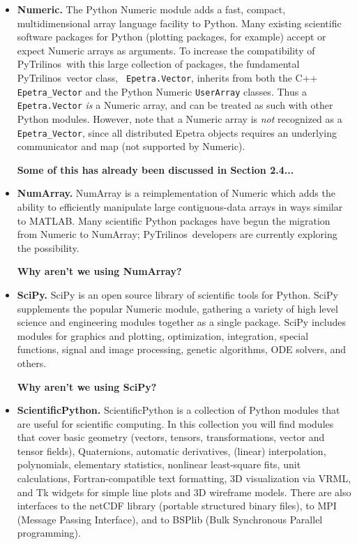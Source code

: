 \documentclass[acmtocl]{acmtrans2m}
\newcommand{\PyTrilinos}{{PyTrilinos}}
\begin{document}
\begin{itemize}

\item {\bf Numeric.} The Python Numeric module adds a fast, compact,
  multidimensional array language facility to Python.  Many existing
  scientific software packages for Python (plotting packages, for
  example) accept or expect Numeric arrays as arguments.  To increase
  the compatibility of \PyTrilinos\ with this large collection of
  packages, the fundamental \PyTrilinos\ vector class, {\tt
    Epetra.Vector}, inherits from both the C++ {\tt Epetra\_Vector}
  and the Python Numeric {\tt UserArray} classes.  Thus a {\tt
    Epetra.Vector} {\sl is} a Numeric array, and can be treated as
  such with other Python modules.  However, note that a Numeric array
  is {\sl not} recognized as a {\tt Epetra\_Vector}, since all
  distributed Epetra objects requires an underlying communicator and
  map (not supported by Numeric). 

  {\bf Some of this has already been discussed in Section 2.4...}

\item {\bf NumArray.}  NumArray is a reimplementation of Numeric which
  adds the ability to efficiently manipulate large contiguous-data
  arrays in ways similar to MATLAB.  Many scientific Python packages
  have begun the migration from Numeric to NumArray; \PyTrilinos\ 
  developers are currently exploring the possibility.

  {\bf Why aren't we using NumArray?}

\item {\bf SciPy.} SciPy is an open source library of scientific tools
  for Python. SciPy supplements the popular Numeric module, gathering
  a variety of high level science and engineering modules together as
  a single package. SciPy includes modules for graphics and plotting,
  optimization, integration, special functions, signal and image
  processing, genetic algorithms, ODE solvers, and others.

  {\bf Why aren't we using SciPy?}

\item {\bf ScientificPython.}  ScientificPython is a collection of
  Python modules that are useful for scientific computing. In this
  collection you will find modules that cover basic geometry (vectors,
  tensors, transformations, vector and tensor fields), Quaternions,
  automatic derivatives, (linear) interpolation, polynomials,
  elementary statistics, nonlinear least-square fits, unit
  calculations, Fortran-compatible text formatting, 3D visualization
  via VRML, and Tk widgets for simple line plots and 3D wireframe
  models. There are also interfaces to the netCDF library (portable
  structured binary files), to MPI (Message Passing Interface), and to
  BSPlib (Bulk Synchronous Parallel programming).


\end{itemize}
\end{document}
